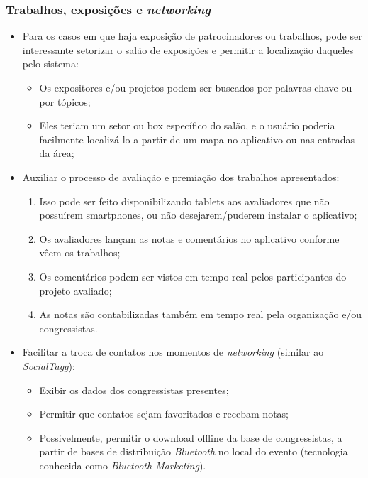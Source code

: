 \documentclass[a4paper]{abntex2}
\begin{document}
\subsubsection*{Trabalhos, exposições e \emph{networking}}
\begin{itemize}
	\item Para os casos em que haja exposição de patrocinadores ou trabalhos, pode ser interessante setorizar o salão de exposições e permitir a localização daqueles pelo sistema:
		\begin{itemize}
			\item Os expositores e/ou projetos podem ser buscados por palavras-chave ou por tópicos;
			\item Eles teriam um setor ou box específico do salão, e o usuário poderia facilmente localizá-lo a partir de um mapa no aplicativo ou nas entradas da área;
		\end{itemize}
	\item Auxiliar o processo de avaliação e premiação dos trabalhos apresentados:
		\begin{enumerate}
			\item Isso pode ser feito disponibilizando tablets aos avaliadores que não possuírem smartphones, ou não desejarem/puderem instalar o aplicativo;
			\item Os avaliadores lançam as notas e comentários no aplicativo conforme vêem os trabalhos;
			\item Os comentários podem ser vistos em tempo real pelos participantes do projeto avaliado;
			\item As notas são contabilizadas também em tempo real pela organização e/ou congressistas.
		\end{enumerate}
	\item Facilitar a troca de contatos nos momentos de \emph{networking} (similar ao \emph{SocialTagg}\cite{socialtagg}):
		\begin{itemize}
			\item Exibir os dados dos congressistas presentes;
			\item Permitir que contatos sejam favoritados e recebam notas;
			\item Possivelmente, permitir o download offline da base de congressistas, a partir de bases de distribuição \emph{Bluetooth} no local do evento (tecnologia conhecida como \emph{Bluetooth Marketing}).
		\end{itemize}
\end{itemize}
\end{document}
